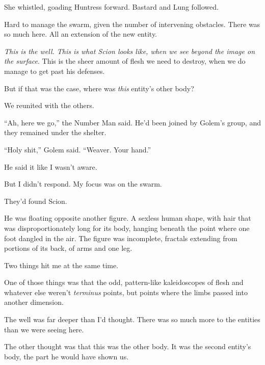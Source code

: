 She whistled, goading Huntress forward.  Bastard and Lung followed.



Hard to manage the swarm, given the number of intervening obstacles.  There was so much here.  All an extension of the new entity.



\emph{This is the well.  This is what Scion looks like, when we see beyond the image on the surface}.  This is the sheer amount of flesh we need to destroy, when we do manage to get past his defenses.



But if that was the case, where was \emph{this} entity's other body?



We reunited with the others.



``Ah, here we go,'' the Number Man said.  He'd been joined by Golem's group, and they remained under the shelter.



``Holy shit,'' Golem said.  ``Weaver.  Your hand.''



He said it like I wasn't aware.



But I didn't respond.  My focus was on the swarm.



They'd found Scion.



He was floating opposite another figure.  A sexless human shape, with hair that was disproportionately long for its body, hanging beneath the point where one foot dangled in the air.  The figure was incomplete, fractals extending from portions of its back, of arms and one leg.



Two things hit me at the same time.



One of those things was that the odd, pattern-like kaleidoscopes of flesh and whatever else weren't \emph{terminus} points, but points where the limbs passed into another dimension.



The well was far deeper than I'd thought.  There was so much more to the entities than we were seeing here.



The other thought was that this was the other body.  It was the second entity's body, the part he would have shown us.



